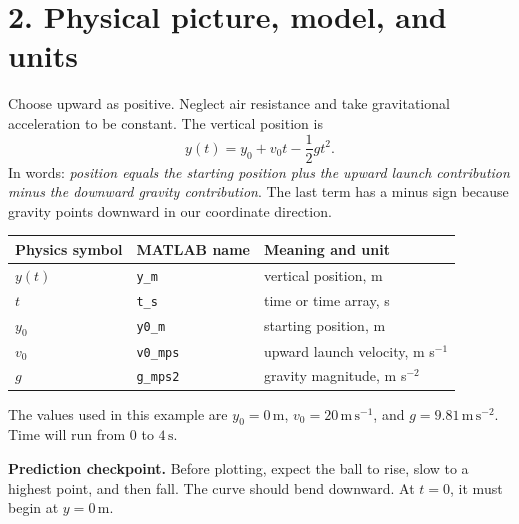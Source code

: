 \documentclass[11pt,a4paper]{article}
\newcommand{\units}[1]{\,\mathrm{#1}}
\begin{document}
\section*{2. Physical picture, model, and units}
Choose upward as positive. Neglect air resistance and take gravitational acceleration to be constant. The vertical position is
\[y(t)=y_0+v_0t-\frac{1}{2}gt^2.\]
In words: \emph{position equals the starting position plus the upward launch contribution minus the downward gravity contribution}. The last term has a minus sign because gravity points downward in our coordinate direction.
\begin{center}\small\begin{tabular}{>{\raggedright\arraybackslash}p{.20\linewidth}>{\raggedright\arraybackslash}p{.24\linewidth}>{\raggedright\arraybackslash}p{.42\linewidth}}\toprule
\textbf{Physics symbol} & \textbf{MATLAB name} & \textbf{Meaning and unit}\\ \midrule
$y(t)$ & \texttt{y\_m} & vertical position, m\\ $t$ & \texttt{t\_s} & time or time array, s\\ $y_0$ & \texttt{y0\_m} & starting position, m\\ $v_0$ & \texttt{v0\_mps} & upward launch velocity, m s$^{-1}$\\ $g$ & \texttt{g\_mps2} & gravity magnitude, m s$^{-2}$\\ \bottomrule\end{tabular}\end{center}
The values used in this example are $y_0=0\units{m}$, $v_0=20\units{m\,s^{-1}}$, and $g=9.81\units{m\,s^{-2}}$. Time will run from $0$ to $4\units{s}$.
\begin{checkbox}\textbf{Prediction checkpoint.} Before plotting, expect the ball to rise, slow to a highest point, and then fall. The curve should bend downward. At $t=0$, it must begin at $y=0\units{m}$.\end{checkbox}
\end{document}
